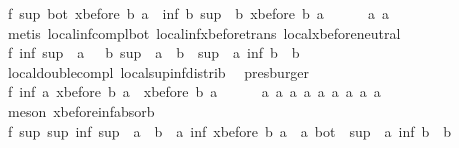 \begin{isabellebody}
\ f{}{}{\isacharcolon}\ {\isachardoublequoteopen}sup\ bot\ {\isacharparenleft}xbefore\ b\ a{\isacharparenright}\ {\isacharequal}\ inf\ b\ {\isacharparenleft}sup\ {\isacharparenleft}{\isacharminus}\ b{\isacharparenright}\ {\isacharparenleft}xbefore\ b\ a{\isacharparenright}{\isacharparenright}{\isachardoublequoteclose}\isanewline
\ \ \ \ \isamarkupfalse%
\ a{}\ a{}\ \isamarkupfalse%
\ {\isacharparenleft}metis\ local{\isachardot}inf{\isacharunderscore}compl{\isacharunderscore}bot\ local{\isachardot}inf{\isacharunderscore}xbefore{\isacharunderscore}trans\ local{\isachardot}xbefore{\isacharunderscore}neutral{\isacharunderscore}{}{\isacharparenright}\isanewline
\ \ \isamarkupfalse%
\ f{}{}{\isacharcolon}\ {\isachardoublequoteopen}inf\ {\isacharparenleft}sup\ {\isacharparenleft}{\isacharminus}\ a{\isacharparenright}\ {\isacharparenleft}{\isacharminus}\ {\isacharparenleft}{\isacharminus}\ b{\isacharparenright}{\isacharparenright}{\isacharparenright}\ {\isacharparenleft}sup\ {\isacharparenleft}{\isacharminus}\ a{\isacharparenright}\ {\isacharparenleft}{\isacharminus}\ b{\isacharparenright}{\isacharparenright}\ {\isacharequal}\ sup\ {\isacharparenleft}{\isacharminus}\ a{\isacharparenright}\ {\isacharparenleft}inf\ b\ {\isacharparenleft}{\isacharminus}\ b{\isacharparenright}{\isacharparenright}{\isachardoublequoteclose}\isanewline
\ \ \ \ \isamarkupfalse%
\ local{\isachardot}double{\isacharunderscore}compl\ local{\isachardot}sup{\isacharunderscore}inf{\isacharunderscore}distrib{}\ \isamarkupfalse%
\ presburger\isanewline
\ \ \isamarkupfalse%
\ f{}{}{\isacharcolon}\ {\isachardoublequoteopen}inf\ a\ {\isacharparenleft}xbefore\ b\ a{\isacharparenright}\ {\isacharequal}\ xbefore\ b\ a{\isachardoublequoteclose}\isanewline
\ \ \ \ \isamarkupfalse%
\ a{}\ a{}\ a{}\ a{}\ a{}\ a{}\ a{}\ a{}\ a{}\ \isamarkupfalse%
\ {\isacharparenleft}meson\ xbefore{\isacharunderscore}inf{\isacharunderscore}absorb{\isacharunderscore}{}{\isacharparenright}\isanewline
\ \ \isamarkupfalse%
\ f{}{}{\isacharcolon}\ {\isachardoublequoteopen}sup\ {\isacharparenleft}sup\ {\isacharparenleft}inf\ {\isacharparenleft}sup\ {\isacharparenleft}{\isacharminus}\ a{\isacharparenright}\ {\isacharparenleft}{\isacharminus}\ b{\isacharparenright}{\isacharparenright}\ {\isacharparenleft}{\isacharminus}\ a{\isacharparenright}{\isacharparenright}\ {\isacharparenleft}inf\ {\isacharparenleft}xbefore\ b\ a{\isacharparenright}\ {\isacharparenleft}{\isacharminus}\ a{\isacharparenright}{\isacharparenright}{\isacharparenright}\ bot\ {\isacharequal}\ sup\ {\isacharparenleft}{\isacharminus}\ a{\isacharparenright}\ {\isacharparenleft}inf\ b\ {\isacharparenleft}{\isacharminus}\ b{\isacharparenright}{\isacharparenright}{\isachardoublequoteclose}\isanewline

\end{isabellebody}
